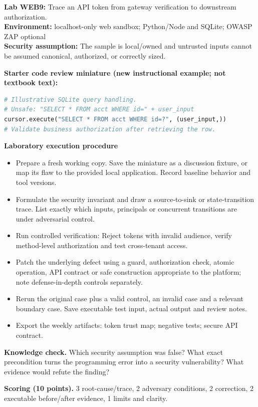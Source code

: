 \documentclass[10pt,letterpaper]{article}
\begin{document}
\begin{insight}\textbf{Lab WEB9:} Trace an API token from gateway verification to downstream authorization.\\\textbf{Environment:} localhost-only web sandbox; Python/Node and SQLite; OWASP ZAP optional\\\textbf{Security assumption:} The sample is local/owned and untrusted inputs cannot be assumed canonical, authorized, or correctly sized.\end{insight}
\textbf{Starter code review miniature (new instructional example; not textbook text):}
\begin{lstlisting}[language=Python]
# Illustrative SQLite query handling.
# Unsafe: "SELECT * FROM acct WHERE id=" + user_input
cursor.execute("SELECT * FROM acct WHERE id=?", (user_input,))
# Validate business authorization after retrieving the row.
\end{lstlisting}
\textbf{Laboratory execution procedure}
\begin{itemize}[leftmargin=*,itemsep=2pt]
\item Prepare a fresh working copy. Save the miniature as a discussion fixture, or map its flaw to the provided local application. Record baseline behavior and tool versions.
\item Formulate the security invariant and draw a source-to-sink or state-transition trace. List exactly which inputs, principals or concurrent transitions are under adversarial control.
\item Run controlled verification: Reject tokens with invalid audience, verify method-level authorization and test cross-tenant access.
\item Patch the underlying defect using a guard, authorization check, atomic operation, API contract or safe construction appropriate to the platform; note defense-in-depth controls separately.
\item Rerun the original case plus a valid control, an invalid case and a relevant boundary case. Save executable test input, actual output and review notes.
\item Export the weekly artifacts: token trust map; negative tests; secure API contract.
\end{itemize}
\textbf{Knowledge check.} Which security assumption was false? What exact precondition turns the programming error into a security vulnerability? What evidence would refute the finding?

\textbf{Scoring (10 points).} 3 root-cause/trace, 2 adversary conditions, 2 correction, 2 executable before/after evidence, 1 limits and clarity.
\end{document}
